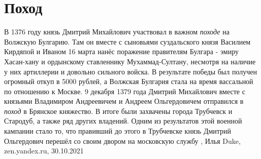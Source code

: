  
 
 
 
 
\chapter{Поход}
\label{sec:slova.pohod}

В 1376 году князь Дмитрий Михайлович участвовал в важном \emph{походе} на Волжскую
Булгарию. Там он вместе с сыновьями суздальского князя Василием Кирдяпой и
Иваном 16 марта нанёс поражение правителям Булгара - эмиру Хасан-хану и
ордынскому ставленнику Мухаммад-Султану, несмотря на наличие у них артиллерии и
довольно сильного войска. В результате победы был получен огромный откуп в 5000
рублей, а Волжская Булгария стала на время вассальной по отношению к Москве.
9 декабря 1379 года Дмитрий Михайлович вместе с князьями Владимиром Андреевичем
и Андреем Ольгердовичем отправился в \emph{поход} в Брянское княжество. В итоге были
захвачены города Трубчевск и Стародуб, а также ряд других владений. Одним из
результатов этой военной кампании стало то, что правивший до этого в Трубчевске
князь Дмитрий Ольгердович перешёл со своим двором на московскую службу
, Илья Duke, zen.yandex.ru, 30.10.2021
